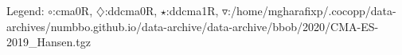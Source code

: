 Legend: {\color{NavyBlue}$\circ$}:cma0R, {\color{Magenta}$\diamondsuit$}:ddcma0R, {\color{Orange}$\star$}:ddcma1R, {\color{CornflowerBlue}$\triangledown$}:/home/mgharafixp/.cocopp/data-archives/numbbo.github.io/data-archive/data-archive/bbob/2020/CMA-ES-2019\_Hansen.tgz